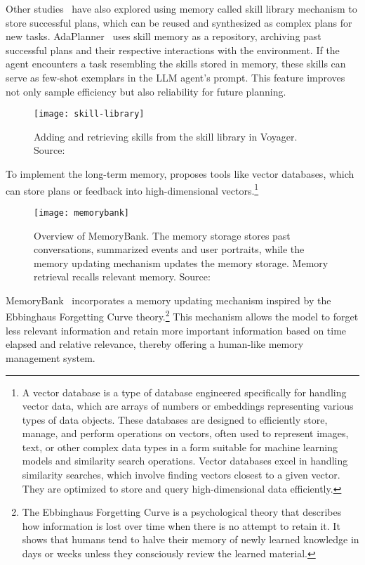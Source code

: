 Other studies~\cite{sun2023adaplanner, wang2023voyager} have also explored using memory called skill library mechanism to store successful plans, which can be reused and synthesized as complex plans for new tasks.
AdaPlanner~\cite{sun2023adaplanner} uses skill memory as a repository, archiving past successful plans and their respective interactions with the environment.
If the agent encounters a task resembling the skills stored in memory, these skills can serve as few-shot exemplars in the LLM agent’s prompt.
This feature improves not only sample efficiency but also reliability for future planning.
\begin{figure}[h!]
	\centering
	\texttt{[image: skill-library]}
	\caption{Adding and retrieving skills from the skill library in Voyager. Source: \textcite{sun2023adaplanner}}
	\label{fig:skill-library}
\end{figure}
To implement the long-term memory, \textcite{wang2023voyager, wang2021milvus} proposes tools like vector databases, which can store plans or feedback into high-dimensional vectors.\footnote{A vector database is a type of database engineered specifically for handling vector data, which are arrays of numbers or embeddings representing various types of data objects.
	These databases are designed to efficiently store, manage, and perform operations on vectors, often used to represent images, text, or other complex data types in a form suitable for machine learning models and similarity search operations.
	Vector databases excel in handling similarity searches, which involve finding vectors closest to a given vector.
	They are optimized to store and query high-dimensional data efficiently.}
\begin{figure}[h!]
	\centering
	\texttt{[image: memorybank]}
	\caption{Overview of MemoryBank. The memory storage stores past conversations, summarized events and user portraits, while the memory updating mechanism updates the memory storage. Memory retrieval recalls relevant memory. Source: \textcite{zhong2023memorybankenhancinglargelanguage}}
	\label{fig:memorybank}
\end{figure}
MemoryBank~\cite{zhong2023memorybankenhancinglargelanguage} incorporates a memory updating mechanism inspired by the Ebbinghaus Forgetting Curve theory.\footnote{The Ebbinghaus Forgetting Curve is a psychological theory that describes how information is lost over time when there is no attempt to retain it.
	It shows that humans tend to halve their memory of newly learned knowledge in days or weeks unless they consciously review the learned material.}
This mechanism allows the model to forget less relevant information and retain more important information based on time elapsed and relative relevance, thereby offering a human-like memory management system.

